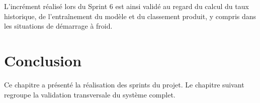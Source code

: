 L'incrément réalisé lors du Sprint 6 est ainsi validé au regard du calcul du taux historique, de l'entraînement du modèle et du classement produit, y compris dans les situations de démarrage à froid. 

\section*{Conclusion}
\justifying
{}
{}

Ce chapitre a présenté la réalisation des sprints du projet. Le chapitre suivant regroupe la validation transversale du système complet.
